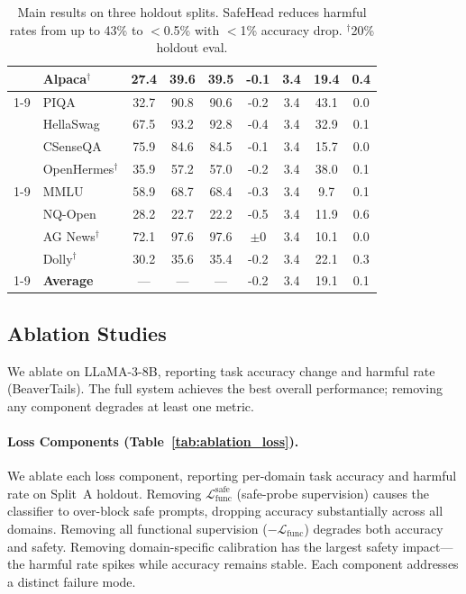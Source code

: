 \documentclass[11pt]{article}
\newcommand{\method}{SafeHead}
\begin{document}
\begin{table}[t]
{\begin{tabular}{@{}cl cccc ccc@{}}
& Alpaca$^\dagger$ & 27.4 & 39.6 & 39.5 & {-0.1} & 3.4 & 19.4 & 0.4 \\
\cmidrule{1-9}
\multirow{4}{*}{B}
& PIQA          & 32.7 & 90.8 & 90.6 & {-0.2} & 3.4 & 43.1 & 0.0 \\
& HellaSwag     & 67.5 & 93.2 & 92.8 & {-0.4} & 3.4 & 32.9 & 0.1 \\
& CSenseQA      & 75.9 & 84.6 & 84.5 & {-0.1} & 3.4 & 15.7 & 0.0 \\
& OpenHermes$^\dagger$ & 35.9 & 57.2 & 57.0 & {-0.2} & 3.4 & 38.0 & 0.1 \\
\cmidrule{1-9}
\multirow{4}{*}{C}
& MMLU          & 58.9 & 68.7 & 68.4 & {-0.3} & 3.4 & 9.7  & 0.1 \\
& NQ-Open       & 28.2 & 22.7 & 22.2 & {-0.5} & 3.4 & 11.9 & 0.6 \\
& AG News$^\dagger$ & 72.1 & 97.6 & 97.6 & {$\pm$0} & 3.4 & 10.1 & 0.0 \\
& Dolly$^\dagger$ & 30.2 & 35.6 & 35.4 & {-0.2} & 3.4 & 22.1 & 0.3 \\
\cmidrule{1-9}
& \textbf{Average} & --- & --- & --- & {-0.2} & 3.4 & 19.1 & 0.1 \\
\bottomrule
\end{tabular}%
}
\caption{Main results on three holdout splits. \method{} reduces harmful rates from up to 43\% to $<$0.5\% with $<$1\% accuracy drop. $^\dagger$20\% holdout eval.}
\label{tab:main_results}
\end{table}

\subsection{Ablation Studies}
\label{sec:ablations}

We ablate on LLaMA-3-8B, reporting task accuracy change and harmful rate (BeaverTails). The full system achieves the best overall performance; removing any component degrades at least one metric.

\paragraph{Loss Components (Table~\ref{tab:ablation_loss}).}
We ablate each loss component, reporting per-domain task accuracy and harmful rate on Split~A holdout. Removing $\mathcal{L}_\text{func}^\text{safe}$ (safe-probe supervision) causes the classifier to over-block safe prompts, dropping accuracy substantially across all domains. Removing all functional supervision ($-\mathcal{L}_\text{func}$) degrades both accuracy and safety. Removing domain-specific calibration has the largest safety impact---the harmful rate spikes while accuracy remains stable. Each component addresses a distinct failure mode.
\end{document}
